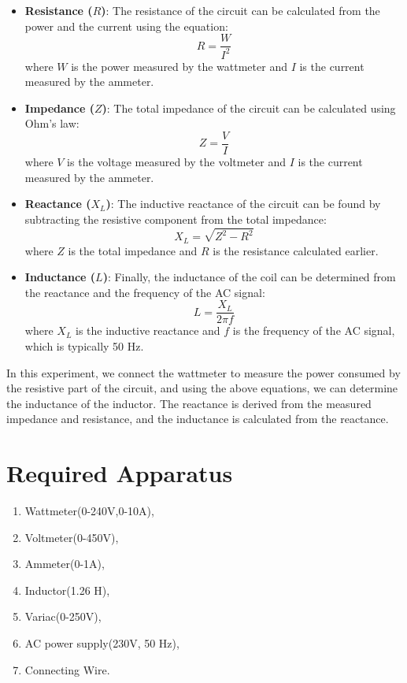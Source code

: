\documentclass[a4paper,12pt]{article}
\begin{document}
	\begin{itemize}
		\item \textbf{Resistance (\( R \))}: The resistance of the circuit can be calculated from the power and the current using the equation:
		\[
		R = \frac{W}{I^2}
		\]
		where \( W \) is the power measured by the wattmeter and \( I \) is the current measured by the ammeter.
		
		\item \textbf{Impedance (\( Z \))}: The total impedance of the circuit can be calculated using Ohm's law:
		\[
		Z = \frac{V}{I}
		\]
		where \( V \) is the voltage measured by the voltmeter and \( I \) is the current measured by the ammeter.
		
		\item \textbf{Reactance (\( X_L \))}: The inductive reactance of the circuit can be found by subtracting the resistive component from the total impedance:
		\[
		X_L = \sqrt{Z^2 - R^2}
		\]
		where \( Z \) is the total impedance and \( R \) is the resistance calculated earlier.
		
		\item \textbf{Inductance (\( L \))}: Finally, the inductance of the coil can be determined from the reactance and the frequency of the AC signal:
		\[
		L = \frac{X_L}{2 \pi f}
		\]
		where \( X_L \) is the inductive reactance and \( f \) is the frequency of the AC signal, which is typically 50 Hz.
	\end{itemize}
	
	In this experiment, we connect the wattmeter to measure the power consumed by the resistive part of the circuit, and using the above equations, we can determine the inductance of the inductor. The reactance is derived from the measured impedance and resistance, and the inductance is calculated from the reactance.
	
	\section{Required Apparatus}
	\begin{enumerate}
		\item Wattmeter(0-240V,0-10A),
		\item Voltmeter(0-450V),
		\item Ammeter(0-1A),
		\item Inductor(1.26 H),
		\item Variac(0-250V),
		\item AC power supply(230V, 50 Hz),
		\item Connecting Wire.

	\end{enumerate}
\end{document}
